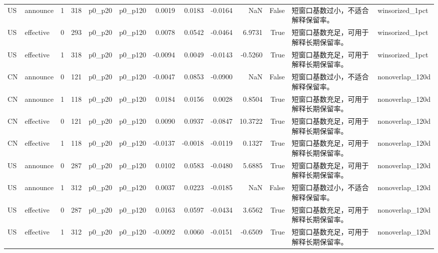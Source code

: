 \begin{tabular}{llrrllrrrrrll}
US & announce & 1 & 318 & p0_p20 & p0_p120 & 0.0019 & 0.0183 & -0.0164 & NaN & False & 短窗口基数过小，不适合解释保留率。 & winsorized_1pct \\
US & effective & 0 & 293 & p0_p20 & p0_p120 & 0.0078 & 0.0542 & -0.0464 & 6.9731 & True & 短窗口基数充足，可用于解释长期保留率。 & winsorized_1pct \\
US & effective & 1 & 318 & p0_p20 & p0_p120 & -0.0094 & 0.0049 & -0.0143 & -0.5260 & True & 短窗口基数充足，可用于解释长期保留率。 & winsorized_1pct \\
CN & announce & 0 & 121 & p0_p20 & p0_p120 & -0.0047 & 0.0853 & -0.0900 & NaN & False & 短窗口基数过小，不适合解释保留率。 & nonoverlap_120d \\
CN & announce & 1 & 118 & p0_p20 & p0_p120 & 0.0184 & 0.0156 & 0.0028 & 0.8504 & True & 短窗口基数充足，可用于解释长期保留率。 & nonoverlap_120d \\
CN & effective & 0 & 121 & p0_p20 & p0_p120 & 0.0090 & 0.0937 & -0.0847 & 10.3722 & True & 短窗口基数充足，可用于解释长期保留率。 & nonoverlap_120d \\
CN & effective & 1 & 118 & p0_p20 & p0_p120 & -0.0137 & -0.0018 & -0.0119 & 0.1327 & True & 短窗口基数充足，可用于解释长期保留率。 & nonoverlap_120d \\
US & announce & 0 & 287 & p0_p20 & p0_p120 & 0.0102 & 0.0583 & -0.0480 & 5.6885 & True & 短窗口基数充足，可用于解释长期保留率。 & nonoverlap_120d \\
US & announce & 1 & 312 & p0_p20 & p0_p120 & 0.0037 & 0.0223 & -0.0185 & NaN & False & 短窗口基数过小，不适合解释保留率。 & nonoverlap_120d \\
US & effective & 0 & 287 & p0_p20 & p0_p120 & 0.0163 & 0.0597 & -0.0434 & 3.6562 & True & 短窗口基数充足，可用于解释长期保留率。 & nonoverlap_120d \\
US & effective & 1 & 312 & p0_p20 & p0_p120 & -0.0092 & 0.0060 & -0.0151 & -0.6509 & True & 短窗口基数充足，可用于解释长期保留率。 & nonoverlap_120d \\
\bottomrule
\end{tabular}
